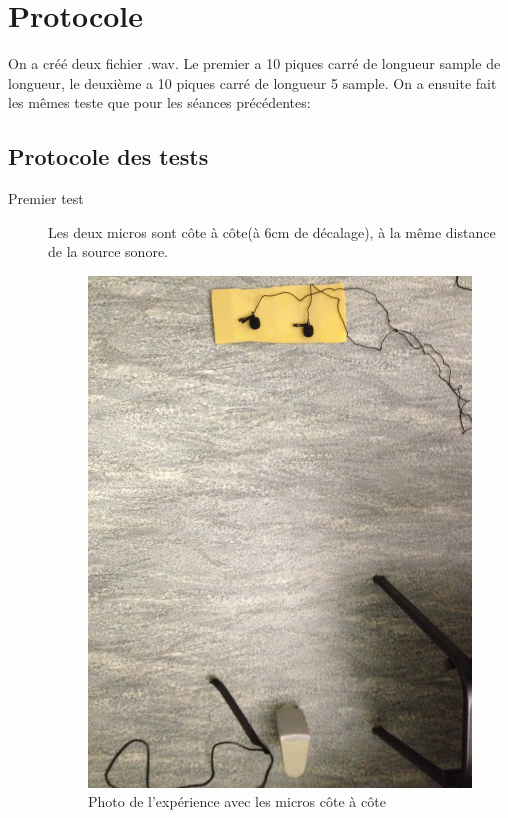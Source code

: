 \documentclass[12pt,a4paper]{report}
\begin{document}
\section{Protocole}
	On a créé deux fichier .wav. Le premier a 10 piques carré de longueur sample de longueur, le deuxième a 10 piques carré de longueur 5 sample.
	On a ensuite fait les mêmes teste que pour les séances précédentes:

\subsection{Protocole des tests}
\begin{description}
\item[Premier test] Les deux micros sont côte à côte(à 6cm de décalage), à la même distance de la source sonore.
	\begin{figure}[H]
	\includegraphics[width=\textwidth]{../donnees11-03/test_1.jpg} 
	\caption{Photo de l'expérience avec les micros côte à côte}

\end{figure}
\end{description}
\end{document}

